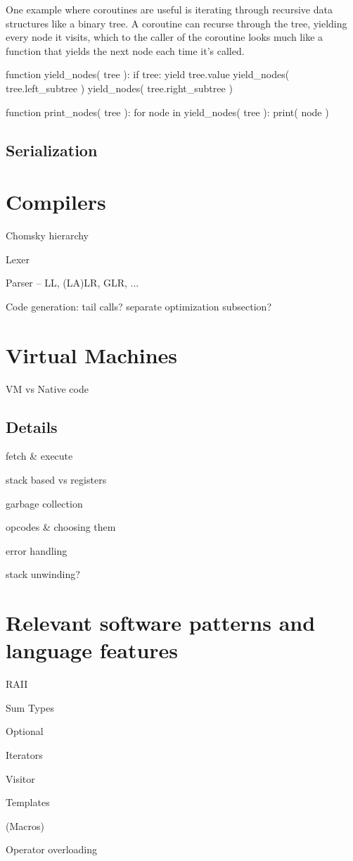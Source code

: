 		One example where coroutines are useful is iterating through recursive data structures like a binary tree. A coroutine can recurse through the tree, yielding every node it visits, which to the caller of the coroutine looks much like a function that yields the next node each time it's called.
		
		\begin{codelisting}[caption={Pseudocode of tree iteration using coroutines}]
function yield_nodes( tree ):
    if tree:
        yield tree.value
        yield_nodes( tree.left_subtree )
        yield_nodes( tree.right_subtree )

function print_nodes( tree ):
    for node in yield_nodes( tree ):
        print( node )
		\end{codelisting}
		
		\subsection{Serialization}
		
	
	\section{Compilers}

		Chomsky hierarchy
		
		Lexer
		
		Parser -- LL, (LA)LR, GLR, ...
		
		Code generation: tail calls? separate optimization subsection?

	\section{Virtual Machines}

		VM vs Native code
		
		\subsection{Details} %
			fetch \& execute
			
			stack based vs registers
			
			garbage collection
			
			opcodes \& choosing them
			
			error handling
			
			stack unwinding?
    
    \section{Relevant software patterns and language features}
    
        RAII
        
        Sum Types
        
        Optional
        
        Iterators
        
        Visitor
        
        Templates
        
        (Macros)
        
        Operator overloading

